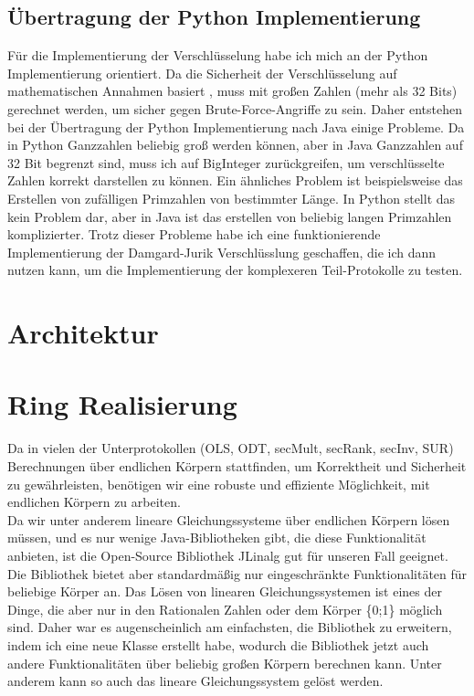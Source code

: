 \subsection{Übertragung der Python Implementierung}
Für die Implementierung der Verschlüsselung habe ich mich an der Python Implementierung \cite{swansonk14} orientiert. Da die Sicherheit der Verschlüsselung auf mathematischen Annahmen basiert  \cite{10.1007/3-540-48910-X_16}, muss mit großen Zahlen (mehr als 32 Bits) gerechnet werden, um sicher gegen Brute-Force-Angriffe zu sein. Daher entstehen bei der Übertragung der Python Implementierung nach Java einige Probleme. Da in Python Ganzzahlen beliebig groß werden können, aber in Java Ganzzahlen auf 32 Bit begrenzt sind, muss ich auf BigInteger zurückgreifen, um verschlüsselte Zahlen korrekt darstellen zu können.
Ein ähnliches Problem ist beispielsweise das Erstellen von zufälligen Primzahlen von bestimmter Länge. In Python stellt das kein Problem dar, aber in Java ist das erstellen von beliebig langen Primzahlen komplizierter. Trotz dieser Probleme habe ich eine funktionierende Implementierung der Damgard-Jurik Verschlüsslung geschaffen, die ich dann nutzen kann, um die Implementierung der komplexeren Teil-Protokolle zu testen.


\section{Architektur}
\section{Ring Realisierung}
Da in vielen der Unterprotokollen (OLS, ODT, secMult, secRank, secInv, SUR) Berechnungen über endlichen Körpern stattfinden, um Korrektheit und Sicherheit zu gewährleisten, benötigen wir eine robuste und effiziente Möglichkeit, mit endlichen Körpern zu arbeiten.\\
Da wir unter anderem lineare Gleichungssysteme über endlichen Körpern lösen müssen, und es nur wenige Java-Bibliotheken gibt, die diese Funktionalität anbieten, ist die Open-Source Bibliothek JLinalg \cite{JLinAlg} gut für unseren Fall geeignet. Die Bibliothek bietet aber standardmäßig nur eingeschränkte Funktionalitäten für beliebige Körper an. Das Lösen von linearen Gleichungssystemen ist eines der Dinge, die aber nur in den  Rationalen Zahlen oder dem Körper \{0;1\} möglich sind. Daher war es augenscheinlich am einfachsten, die Bibliothek zu erweitern, indem ich eine neue Klasse erstellt habe, wodurch die Bibliothek jetzt auch andere Funktionalitäten über beliebig großen Körpern berechnen kann. Unter anderem kann so auch das lineare Gleichungssystem gelöst werden.\\

